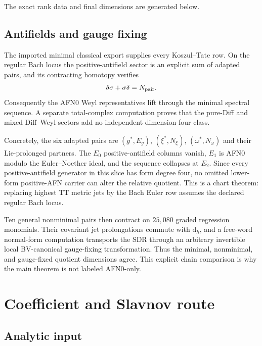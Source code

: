 \documentclass[11pt]{article}
\theoremstyle{definition}
\theoremstyle{remark}
\newcommand{\dd}{\mathrm d}
\begin{document}
The exact rank data and final dimensions are generated below.



\subsection{Antifields and gauge fixing}

The imported minimal classical export supplies every Koszul--Tate row.  On
the regular Bach locus the positive-antifield sector is an explicit sum of
adapted pairs, and its contracting homotopy verifies
\[
 \delta\sigma+\sigma\delta=N_{\rm pair}.
\]
Consequently the AFN0 Weyl representatives lift through the minimal spectral
sequence.  A separate total-complex computation proves that the pure-Diff and
mixed Diff--Weyl sectors add no independent dimension-four class.

Concretely, the six adapted pairs are $(g^*,E_g)$,
$(\xi^*,N_\xi)$, $(\omega^*,N_\omega)$ and their Lie-prolonged partners.
The $E_0$ positive-antifield columns vanish, $E_1$ is AFN0 modulo the
Euler--Noether ideal, and the sequence collapses at $E_2$.  Since every
positive-antifield generator in this slice has form degree four, no omitted
lower-form positive-AFN carrier can alter the relative quotient.  This is a
chart theorem: replacing highest TT metric jets by the Bach Euler row assumes
the declared regular Bach locus.

Ten general nonminimal pairs then contract on $25{,}080$ graded regression
monomials.  Their covariant jet prolongations commute with $\dd_h$, and a
free-word normal-form computation transports the SDR through an arbitrary
invertible local BV-canonical gauge-fixing transformation.  Thus the minimal,
nonminimal, and gauge-fixed quotient dimensions agree.  This explicit chain
comparison is why the main theorem is not labeled AFN0-only.

\section{Coefficient and Slavnov route}

\subsection{Analytic input}
\end{document}
